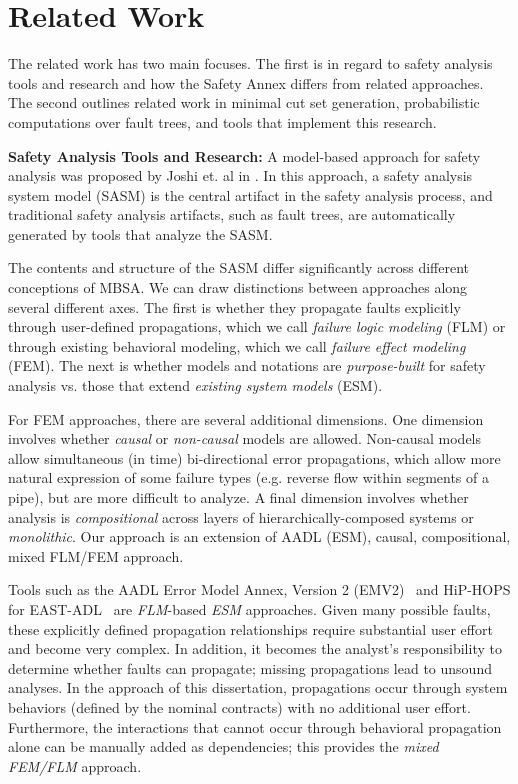\section{Related Work}
The related work has two main focuses. The first is in regard to safety analysis tools and research and how the Safety Annex differs from related approaches. The second outlines related work in minimal cut set generation, probabilistic computations over fault trees, and tools that implement this research. 

\textbf{Safety Analysis Tools and Research:}
A model-based approach for safety analysis was proposed by Joshi et. al in \cite{Joshi05:Dasc, Joshi05:SafeComp, Joshi07:Hase}.  In this approach, a safety analysis system model (SASM) is the central artifact in the safety analysis process, and traditional safety analysis artifacts, such as fault trees, are automatically generated by tools that analyze the SASM.

The contents and structure of the SASM differ significantly across different conceptions of MBSA.  We can draw distinctions between approaches along several different axes.  The first is whether they propagate faults explicitly through user-defined propagations, which we call {\em failure logic modeling} (FLM) or through existing behavioral modeling, which we call {\em failure effect modeling} (FEM).  The next is whether models and notations are {\em purpose-built} for safety analysis vs. those that extend {\em existing system models} (ESM).

For FEM approaches, there are several additional dimensions.  One dimension involves whether {\em causal} or {\em non-causal} models are allowed.  Non-causal models allow simultaneous (in time) bi-directional %
error propagations, which allow more natural expression of some failure types (e.g. reverse flow within segments of a pipe), but are more difficult to analyze.  A final dimension involves whether analysis is {\em compositional} across layers of hierarchically-composed systems or {\em monolithic}.  Our approach is an extension of AADL (ESM), causal, compositional, mixed FLM/FEM approach.

Tools such as the AADL Error Model Annex, Version 2 (EMV2)~\cite{EMV2} and HiP-HOPS for EAST-ADL~\cite{CHEN201391} are {\em FLM}-based {\em ESM} approaches.  Given many possible faults, these explicitly defined propagation relationships require substantial user effort and become very complex.  In addition, it becomes the analyst's responsibility to determine whether faults can propagate; missing propagations lead to unsound analyses.  In the approach of this dissertation, propagations occur through system behaviors (defined by the nominal contracts) with no additional user effort. Furthermore, the interactions that cannot occur through behavioral propagation alone can be manually added as dependencies; this provides the \textit{mixed FEM/FLM} approach.

